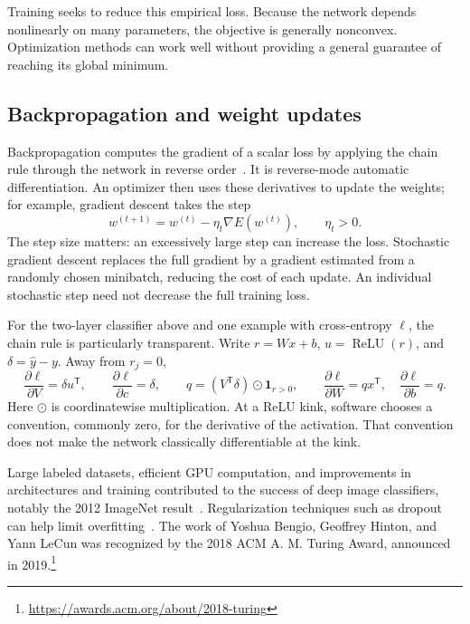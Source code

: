 Training seeks to reduce this empirical loss. Because the network depends nonlinearly on many parameters, the objective is generally nonconvex. Optimization methods can work well without providing a general guarantee of reaching its global minimum.

\subsection{Backpropagation and weight updates}
Backpropagation computes the gradient of a scalar loss by applying the chain rule through the network in reverse order~\cite{rumelhart1986learning,linnainmaa1976taylor}. It is reverse-mode automatic differentiation. An optimizer then uses these derivatives to update the weights; for example, gradient descent takes the step
\[
 w^{(t+1)}=w^{(t)}-\eta_t\nabla E(w^{(t)}),\qquad \eta_t>0.
\]
The step size matters: an excessively large step can increase the loss. Stochastic gradient descent replaces the full gradient by a gradient estimated from a randomly chosen minibatch, reducing the cost of each update. An individual stochastic step need not decrease the full training loss.

For the two-layer classifier above and one example with cross-entropy $\ell$, the chain rule is particularly transparent. Write $r=Wx+b$, $u=\operatorname{ReLU}(r)$, and $\delta=\hat y-y$. Away from $r_j=0$,
\[
 \frac{\partial\ell}{\partial V}=\delta u^\mathsf{T},\qquad
 \frac{\partial\ell}{\partial c}=\delta,\qquad
 q=(V^\mathsf{T}\delta)\odot\mathbf1_{r>0},\qquad
 \frac{\partial\ell}{\partial W}=qx^\mathsf{T},\quad
 \frac{\partial\ell}{\partial b}=q.
\]
Here $\odot$ is coordinatewise multiplication. At a ReLU kink, software chooses a convention, commonly zero, for the derivative of the activation. That convention does not make the network classically differentiable at the kink.

Large labeled datasets, efficient GPU computation, and improvements in architectures and training contributed to the success of deep image classifiers, notably the 2012 ImageNet result~\cite{krizhevsky2012imagenet}. Regularization techniques such as dropout can help limit overfitting~\cite{srivastava2014dropout}. The work of Yoshua Bengio, Geoffrey Hinton, and Yann LeCun was recognized by the 2018 ACM A. M. Turing Award, announced in 2019.\footnote{\url{https://awards.acm.org/about/2018-turing}}

